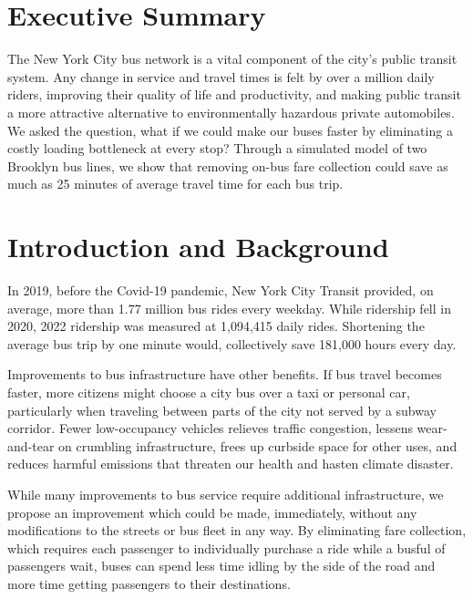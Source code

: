 \documentclass[12pt]{article}
\title{}
\author{Morgan Wajda-Levie}
\theoremstyle{definition}
\begin{document}
\maketitle

\section{Executive Summary}

The New York City bus network is a vital component of the city's public
transit system. Any change in service and travel times is felt by over a
million daily riders, improving their quality of life and productivity, and
making public transit a more attractive alternative to environmentally
hazardous private automobiles. We asked the question, what if we could make
our buses faster by eliminating a costly loading bottleneck at every stop?
Through a simulated model of two Brooklyn bus lines, we show that removing
on-bus fare collection could save as much as 25 minutes of average
travel time for each bus trip.

\section{Introduction and Background}

In 2019, before the Covid-19 pandemic, New York City Transit provided, on
average, more than 1.77 million bus rides every weekday. While ridership fell
in 2020, 2022 ridership was measured at 1,094,415 daily
rides\cite{mta_2022NYCT_2022}.
Shortening the average bus trip by one minute would, collectively save
181,000 hours every day.

Improvements to bus infrastructure have other benefits. If bus travel becomes
faster, more citizens might choose a city bus over a taxi or personal car,
particularly when traveling between parts of the city not served by a subway
corridor. Fewer low-occupancy vehicles relieves traffic congestion, lessens
wear-and-tear on crumbling infrastructure, frees up curbside space for other
uses, and reduces harmful emissions that threaten our health and hasten
climate disaster.

While many improvements to bus service require additional infrastructure,
we propose an improvement which could be made, immediately, without any
modifications to the streets or bus fleet in any way. By eliminating fare
collection, which requires each passenger to individually purchase a ride
while a busful of passengers wait, buses can spend less time idling by the
side of the road and more time getting passengers to their destinations.
\end{document}
